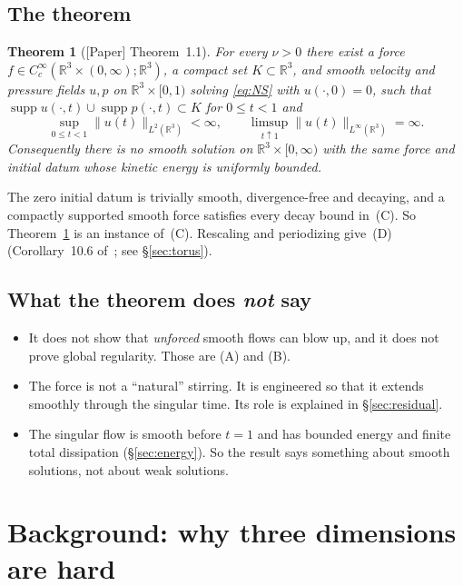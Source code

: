 \documentclass[11pt]{article}
\newcommand{\R}{\mathbb{R}}
\DeclareMathOperator{\supp}{supp}
\theoremstyle{plain}
\newtheorem{theorem}{Theorem}
\theoremstyle{remark}
\newcommand{\paper}{\textsf{\small[Paper]}}
\begin{document}
\subsection{The theorem}
\begin{theorem}[\paper{} Theorem~1.1]\label{thm:main}
For every $\nu>0$ there exist a force $f\in C_c^\infty(\R^3\times(0,\infty);\R^3)$, a compact set $K\subset\R^3$, and smooth velocity and pressure fields $u,p$ on $\R^3\times[0,1)$ solving \eqref{eq:NS} with $u(\cdot,0)=0$, such that $\supp u(\cdot,t)\cup\supp p(\cdot,t)\subset K$ for $0\le t<1$ and
\[
\sup_{0\le t<1}\|u(t)\|_{L^2(\R^3)}<\infty,\qquad \limsup_{t\uparrow1}\|u(t)\|_{L^\infty(\R^3)}=\infty .
\]
Consequently there is no smooth solution on $\R^3\times[0,\infty)$ with the same force and initial datum whose kinetic energy is uniformly bounded.
\end{theorem}

The zero initial datum is trivially smooth, divergence-free and decaying, and a compactly supported smooth force satisfies every decay bound in~(C). So Theorem~\ref{thm:main} is an instance of~(C). Rescaling and periodizing give~(D) (Corollary~10.6 of~\cite{OAI}; see \S\ref{sec:torus}).

\subsection{What the theorem does \emph{not} say}
\begin{itemize}[itemsep=1pt]
\item It does not show that \emph{unforced} smooth flows can blow up, and it does not prove global regularity. Those are (A) and (B).
\item The force is not a ``natural'' stirring. It is engineered so that it extends smoothly through the singular time. Its role is explained in \S\ref{sec:residual}.
\item The singular flow is smooth before $t=1$ and has bounded energy and finite total dissipation (\S\ref{sec:energy}). So the result says something about smooth solutions, not about weak solutions.
\end{itemize}

\section{Background: why three dimensions are hard}\label{sec:background}
\end{document}
